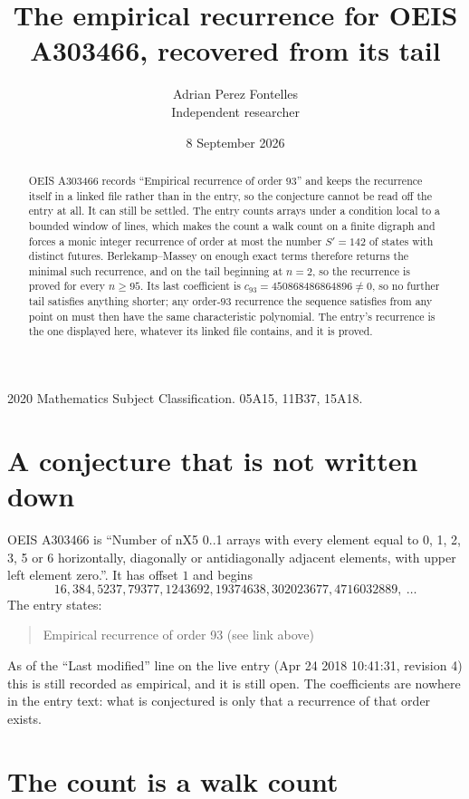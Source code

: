 \documentclass[11pt,a4paper]{article}
\title{The empirical recurrence for OEIS A303466, recovered from its tail}
\author{Adrian Perez Fontelles\\ \small Independent researcher}
\date{8 September 2026}
\theoremstyle{plain}
\theoremstyle{definition}
\begin{document}
\maketitle

\begin{abstract}
OEIS A303466 records ``Empirical recurrence of order $93$'' and keeps the recurrence itself in
a linked file rather than in the entry, so the conjecture cannot be read off the entry at all.
It can still be settled. The entry counts arrays under a condition local to a bounded window of
lines, which makes the count a walk count on a finite digraph and forces a monic integer
recurrence of order at most the number $S'=142$ of states with distinct futures. Berlekamp--Massey on
enough exact terms therefore returns the minimal such recurrence, and on the tail beginning at $n=2$, so the recurrence is proved for every $n\ge95$.
Its last coefficient is $c_{93}=450868486864896\neq0$, so no further tail satisfies anything
shorter; any order-$93$ recurrence the sequence satisfies from any point on must then have
the same characteristic polynomial. The entry's recurrence is the one displayed here, whatever
its linked file contains, and it is proved.
\end{abstract}

\noindent\small 2020 Mathematics Subject Classification. 05A15, 11B37, 15A18.\normalsize

\section{A conjecture that is not written down}

OEIS A303466 is ``Number of nX5 0..1 arrays with every element equal to 0, 1, 2, 3, 5 or 6 horizontally, diagonally or antidiagonally adjacent elements, with upper left element zero.''. It has offset $1$ and begins
\[
16, 384, 5237, 79377, 1243692, 19374638, 302023677, 4716032889,\ \dots
\]
The entry states:
\begin{quote}
Empirical recurrence of order 93 (see link above)
\end{quote}
As of the ``Last modified'' line on the live entry (Apr 24 2018 10:41:31, revision 4)
this is still recorded as empirical, and it is still open. The coefficients are nowhere in the
entry text: what is conjectured is only that a recurrence of that order exists.

\section{The count is a walk count}
\end{document}
